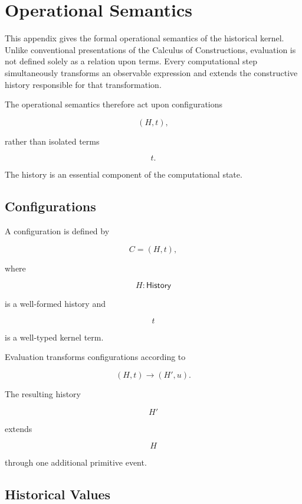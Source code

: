 \documentclass[12pt,oneside]{article}
\theoremstyle{definition}
\theoremstyle{remark}
\begin{document}
\section{Operational Semantics}

This appendix gives the formal operational semantics of the historical kernel.
Unlike conventional presentations of the Calculus of Constructions, evaluation
is not defined solely as a relation upon terms. Every computational step
simultaneously transforms an observable expression and extends the constructive
history responsible for that transformation.

The operational semantics therefore act upon configurations

\[
(H,t),
\]

rather than isolated terms

\[
t.
\]

The history is an essential component of the computational state.


\subsection{Configurations}

A configuration is defined by

\[
C
=
(H,t),
\]

where

\[
H
:
\mathsf{History}
\]

is a well-formed history and

\[
t
\]

is a well-typed kernel term.

Evaluation transforms configurations according to

\[
(H,t)
\longrightarrow
(H',u).
\]

The resulting history

\[
H'
\]

extends

\[
H
\]

through one additional primitive event.


\subsection{Historical Values}
\end{document}
